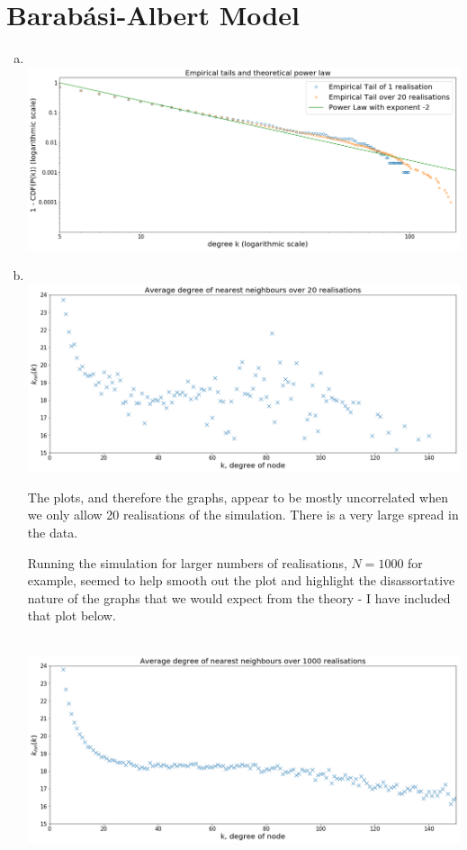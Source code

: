 \documentclass[12pt, twoside, a4paper]{article}
\begin{document}
\section{Barab\'asi-Albert Model}
\begin{enumerate}[a)]
\item
\text{}\\
\hspace*{-2cm}
\includegraphics[width = 190mm]{tail}

\vspace{100mm}

\item
\text{}\\
\hspace*{-2cm}
\includegraphics[width = 190mm]{knn}

The plots, and therefore the graphs, appear to be mostly uncorrelated when we only allow 20 realisations of the simulation. There is a very large spread in the data. 

Running the simulation for larger numbers of realisations, $N=1000$ for example, seemed to help smooth out the plot and highlight the disassortative nature of the graphs that we would expect from the theory - I have included that plot below. 

\text{}\\
\hspace*{-2cm}
\includegraphics[width = 190mm]{knn1000} 


\end{enumerate}
\end{document}
